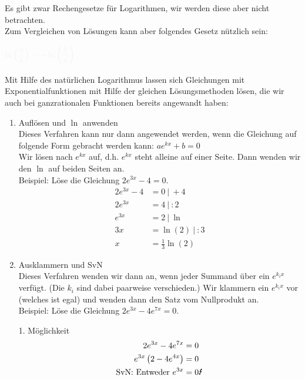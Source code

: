 \newpage
Es gibt zwar Rechengesetze für Logarithmen, wir werden diese aber nicht betrachten.\\
Zum Vergleichen von Lösungen kann aber folgendes Gesetz nützlich sein:
\begin{tcolorbox}\centering
	\(\textcolor{loestc}{\ln\left(\dfrac{a}{b}\right)=-\ln\left(\dfrac{b}{a}\right)}\)
\end{tcolorbox}
Mit Hilfe des natürlichen Logarithmus lassen sich Gleichungen mit Exponentialfunktionen mit Hilfe der gleichen Lösungsmethoden lösen, die wir auch bei ganzrationalen Funktionen bereits angewandt haben:
\begin{enumerate}[label=\arabic*)]
	\item Auflösen und \(\ln\) anwenden\\
	Dieses Verfahren kann nur dann angewendet werden, wenn die Gleichung auf folgende Form gebracht werden kann: \(ae^{kx}+b=0\)\\
	Wir lösen nach \(e^{kx}\) auf, d.h. \(e^{kx}\) steht alleine auf einer Seite. Dann wenden wir den \(\ln\) auf beiden Seiten an.\\
	Beispiel: Löse die Gleichung \(2e^{3x}-4=0\).
	\textcolor{loes}{\begin{align*}
			2e^{3x}-4&=0\ \vert\ +4\\
			2e^{3x}&=4\ \vert\ :2\\
			e^{3x}&=2\ \vert\ \ln\\
			3x&=\ln\left(2\right)\ \vert\ :3\\
			x&=\frac{1}{3}\ln\left(2\right)
	\end{align*}}
	\item Ausklammern und SvN\\
	Dieses Verfahren wenden wir dann an, wenn jeder Summand über ein \(e^{k_ix}\) verfügt. (Die \(k_i\) sind dabei paarweise verschieden.) Wir klammern ein \(e^{k_ix}\) vor (welches ist egal) und wenden dann den Satz vom Nullprodukt an.\\
	Beispiel: Löse die Gleichung \(2e^{3x}-4e^{7x}=0\).\\
	\begin{minipage}{\textwidth}\vspace{.15cm}
		\begin{minipage}[t]{0.49\textwidth}
			1. Möglichkeit
			\textcolor{loes}{\begin{align*}
					2e^{3x}-4e^{7x}&=0\\
					e^{3x}\left(2-4e^{4x}\right) &=0\\
					\text{SvN: Entweder }e^{3x}&=0 \text{\Lightning}\\

\end{align*}}
\end{minipage}
\end{minipage}
\end{enumerate}
